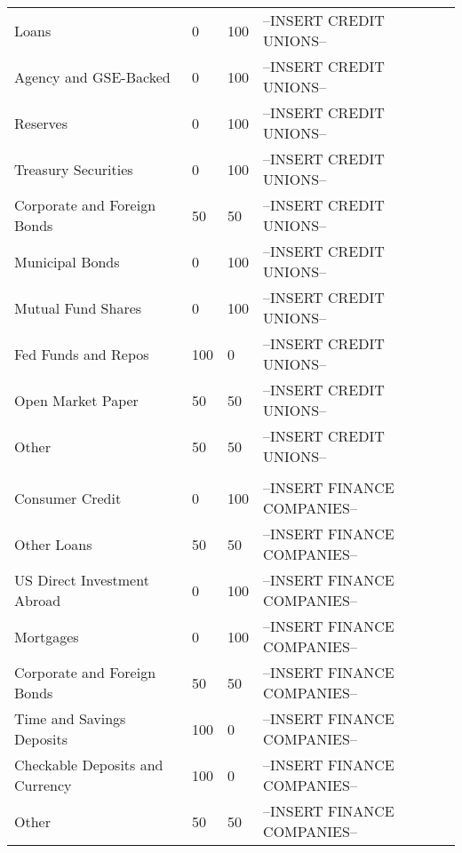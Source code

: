 \begin{longtable}{>{\raggedright}p{10cm}>{\raggedright}p{1cm}>{\raggedright}p{1cm}>{\raggedright}p{4cm}}
\hspace*{0.5cm} Loans & 0 & 100 & --INSERT CREDIT UNIONS-- \tabularnewline  
\hspace*{0.5cm} Agency and GSE-Backed & 0 & 100 & --INSERT CREDIT UNIONS-- \tabularnewline  
\hspace*{0.5cm} Reserves & 0 & 100 & --INSERT CREDIT UNIONS-- \tabularnewline  
\hspace*{0.5cm} Treasury Securities & 0 & 100 & --INSERT CREDIT UNIONS-- \tabularnewline
\hspace*{0.5cm} Corporate and Foreign Bonds & 50 & 50 & --INSERT CREDIT UNIONS-- \tabularnewline  
\hspace*{0.5cm} Municipal Bonds & 0 & 100 & --INSERT CREDIT UNIONS-- \tabularnewline  
\hspace*{0.5cm} Mutual Fund Shares & 0 & 100 & --INSERT CREDIT UNIONS-- \tabularnewline  
\hspace*{0.5cm} Fed Funds and Repos & 100 & 0 & --INSERT CREDIT UNIONS-- \tabularnewline  
\hspace*{0.5cm} Open Market Paper & 50 & 50 & --INSERT CREDIT UNIONS-- \tabularnewline
\hspace*{0.5cm} Other & 50 & 50 & --INSERT CREDIT UNIONS-- \tabularnewline


\hline
\multicolumn{3}{l}{Other: Finance Companies (Assets)}\tabularnewline
\hline 
\hspace*{0.5cm} Consumer Credit & 0 & 100 & --INSERT FINANCE COMPANIES-- \tabularnewline  
\hspace*{0.5cm} Other Loans & 50 & 50 & --INSERT FINANCE COMPANIES-- \tabularnewline  
\hspace*{0.5cm} US Direct Investment Abroad  & 0 & 100 & --INSERT FINANCE COMPANIES-- \tabularnewline  
\hspace*{0.5cm} Mortgages & 0 & 100 & --INSERT FINANCE COMPANIES-- \tabularnewline  
\hspace*{0.5cm} Corporate and Foreign Bonds & 50 & 50 & --INSERT FINANCE COMPANIES-- \tabularnewline  
\hspace*{0.5cm} Time and Savings Deposits & 100 & 0 & --INSERT FINANCE COMPANIES-- \tabularnewline  
\hspace*{0.5cm} Checkable Deposits and Currency & 100 & 0 & --INSERT FINANCE COMPANIES-- \tabularnewline  
\hspace*{0.5cm} Other  & 50 & 50 & --INSERT FINANCE COMPANIES-- \tabularnewline  


\end{longtable}
